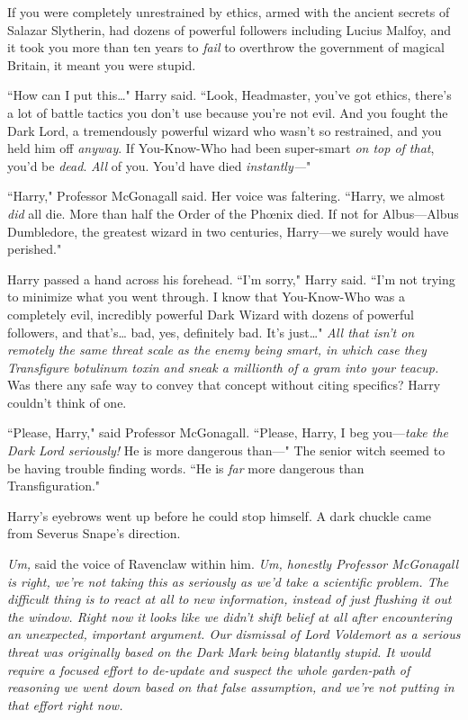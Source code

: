 If you were completely unrestrained by ethics, armed with the ancient secrets of Salazar Slytherin, had dozens of powerful followers including Lucius Malfoy, and it took you more than ten years to \emph{fail} to overthrow the government of magical Britain, it meant you were stupid.

``How can I put this{\ldots}" Harry said. ``Look, Headmaster, you've got ethics, there's a lot of battle tactics you don't use because you're not evil. And you fought the Dark Lord, a tremendously powerful wizard who wasn't so restrained, and you held him off \emph{anyway}. If You-Know-Who had been super-smart \emph{on top of that}, you'd be \emph{dead}. \emph{All} of you. You'd have died \emph{instantly—}"

``Harry," Professor McGonagall said. Her voice was faltering. ``Harry, we almost \emph{did} all die. More than half the Order of the Phœnix died. If not for Albus—Albus Dumbledore, the greatest wizard in two centuries, Harry—we surely would have perished."

Harry passed a hand across his forehead. ``I'm sorry," Harry said. ``I'm not trying to minimize what you went through. I know that You-Know-Who was a completely evil, incredibly powerful Dark Wizard with dozens of powerful followers, and that's{\ldots} bad, yes, definitely bad. It's just{\ldots}" \emph{All that isn't on remotely the same threat scale as the enemy being smart, in which case they Transfigure botulinum toxin and sneak a millionth of a gram into your teacup.} Was there any safe way to convey that concept without citing specifics? Harry couldn't think of one.

``Please, Harry," said Professor McGonagall. ``Please, Harry, I beg you—\emph{take the Dark Lord seriously!} He is more dangerous than—" The senior witch seemed to be having trouble finding words. ``He is \emph{far} more dangerous than Transfiguration."

Harry's eyebrows went up before he could stop himself. A dark chuckle came from Severus Snape's direction.

\emph{Um,} said the voice of Ravenclaw within him. \emph{Um, honestly Professor McGonagall is right, we're not taking this as seriously as we'd take a scientific problem. The difficult thing is to react \emph{at all} to new information, instead of just flushing it out the window. Right now it looks like we didn't shift belief \emph{at all} after encountering an unexpected, important argument. Our dismissal of Lord Voldemort as a serious threat \emph{was} originally based on the Dark Mark being blatantly stupid. It would require a focused effort to de-update and suspect the whole garden-path of reasoning we went down based on that false assumption, and we're \emph{not} putting in that effort right now.}

